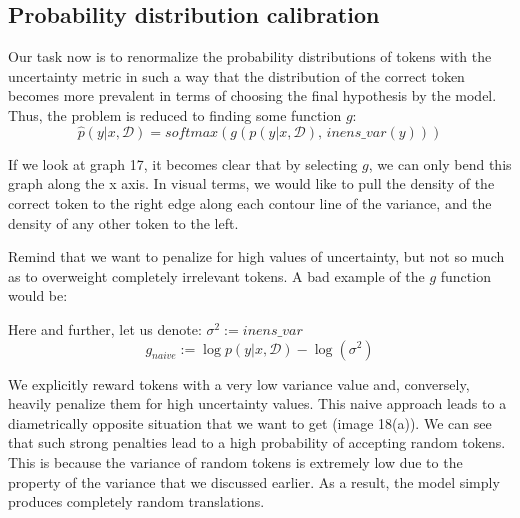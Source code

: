 \documentclass[a4paper,14pt]{extarticle}
\begin{document}
\subsection{Probability distribution calibration}
	Our task now is to renormalize the probability distributions of tokens with the uncertainty metric in such a way that the distribution of the correct token becomes more prevalent in terms of choosing the final hypothesis by the model. Thus, the problem is reduced to finding some function $g$:
	\begin{equation*}
		\hat{p}(y | x, \mathcal{D}) = softmax(g(p(y | x, \mathcal{D}),\, inens\_var(y)))
	\end{equation*}
	
	If we look at graph 17, it becomes clear that by selecting $g$, we can only bend this graph along the x axis. In visual terms, we would like to pull the density of the correct token to the right edge along each contour line of the variance, and the density of any other token to the left.
	
	\begin{figure}[t]
	\end{figure} 
	
	Remind that we want to penalize for high values of uncertainty, but not so much as to overweight completely irrelevant tokens. A bad example of the $g$ function would be:
	
	Here and further, let us denote: $\sigma^2 := inens\_var$
	\begin{equation}
		g_{naive} := \log p(y | x, \mathcal{D}) - \log(\sigma^2)
	\end{equation}
	
	We explicitly reward tokens with a very low variance value and, conversely, heavily penalize them for high uncertainty values. This naive approach leads to a diametrically opposite situation that we want to get (image 18(a)). We can see that such strong penalties lead to a high probability of accepting random tokens. This is because the variance of random tokens is extremely low due to the property of the variance that we discussed earlier. As a result, the model simply produces completely random translations.
	
\end{document}
